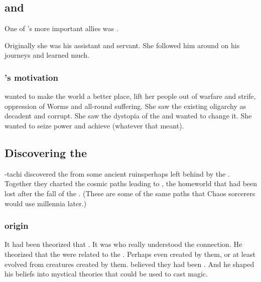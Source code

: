 \subsection[Sethicus and Tyrasshana]{\Sethicus and \Tiamat}
One of \Sethicus's more important allies was . 

Originally she was his assistant and servant.
She followed him around on his journeys and learned much. 





\subsubsection[Tyrasshana's]{\Tiamat's motivation}
\Tiamat wanted to make the world a better place, lift her people out of warfare and strife, oppression of Worms and all-round suffering.
She saw the existing \ophidian oligarchy as decadent and corrupt. 
She saw the dystopia of the  and wanted to change it.
She wanted to seize power and achieve  (whatever that meant). 









\subsection{Discovering the \xss}
\Sethicus-tachi discovered the \xss{} from some ancient ruins\dash perhaps left behind by the \voyagers. 
Together they charted the cosmic paths leading to \Machai, the \xzaishannic{} homeworld that had been lost after the fall of the \ophidians. 
(These are some of the same paths that Chaos sorcerers would use millennia later.)





\subsubsection{\Ophidian origin}
It had been theorized that . 
It was \Sethicus who really understood the connection. 
He theorized that the \ophidians were related to the \xss.
Perhaps even created by them, or at least evolved from creatures created by them.
\Sethicus believed they had been . 
And he shaped his beliefs into mystical theories that could be used to cast magic. 

